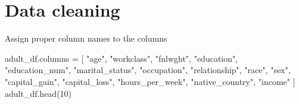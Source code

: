 \documentclass[
  letterpaper,
  DIV=11,
  numbers=noendperiod]{scrartcl}
\newenvironment{Shaded}{\begin{snugshade}}{\end{snugshade}}
\newcommand{\DecValTok}[1]{\textcolor[rgb]{0.68,0.00,0.00}{#1}}
\newcommand{\NormalTok}[1]{\textcolor[rgb]{0.00,0.23,0.31}{#1}}
\newcommand{\OperatorTok}[1]{\textcolor[rgb]{0.37,0.37,0.37}{#1}}
\newcommand{\StringTok}[1]{\textcolor[rgb]{0.13,0.47,0.30}{#1}}
\begin{document}
\section{Data cleaning}\label{data-cleaning-1}

Assign proper column names to the columns

\begin{Shaded}
\begin{Highlighting}[]
\NormalTok{adult\_df.columns }\OperatorTok{=}\NormalTok{ [}
    \StringTok{"age"}\NormalTok{, }\StringTok{"workclass"}\NormalTok{, }\StringTok{"fnlwght"}\NormalTok{, }\StringTok{"education"}\NormalTok{, }\StringTok{"education\_num"}\NormalTok{, }
    \StringTok{"marital\_status"}\NormalTok{, }\StringTok{"occupation"}\NormalTok{, }\StringTok{"relationship"}\NormalTok{, }\StringTok{"race"}\NormalTok{, }\StringTok{"sex"}\NormalTok{, }
    \StringTok{"capital\_gain"}\NormalTok{, }\StringTok{"capital\_loss"}\NormalTok{, }\StringTok{"hours\_per\_week"}\NormalTok{, }
    \StringTok{"native\_country"}\NormalTok{, }\StringTok{"income"}
\NormalTok{]}
\NormalTok{adult\_df.head(}\DecValTok{10}\NormalTok{)}
\end{Highlighting}
\end{Shaded}
\end{document}
